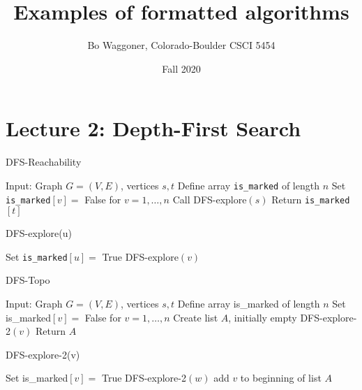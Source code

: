 \documentclass[10pt]{article}
\begin{document}
\title{Examples of formatted algorithms}
\author{Bo Waggoner, Colorado-Boulder CSCI 5454}
\date{Fall 2020}
\maketitle

\section{Lecture 2: Depth-First Search}

\begin{algorithm}
\caption{DFS-Reachability}
\begin{algorithmic}[1]
  \STATE Input: Graph $G = (V,E)$, vertices $s,t$
  \STATE Define array \texttt{is\_marked} of length $n$
  \STATE Set \texttt{is\_marked}$[v] = $ False for $v = 1,\dots,n$
  \STATE Call DFS-explore$(s)$
  \STATE Return \texttt{is\_marked}$[t]$
\end{algorithmic}
\end{algorithm}

\begin{algorithm}
\caption{DFS-explore(u)}
\begin{algorithmic}[1]
  \STATE Set \texttt{is\_marked}$[u] = $ True
      \STATE DFS-explore$(v)$
    \ENDIF
  \ENDFOR
\end{algorithmic}
\end{algorithm}


\begin{algorithm}
\caption{DFS-Topo}
\begin{algorithmic}[1]
  \STATE Input: Graph $G = (V,E)$, vertices $s,t$
  \STATE Define array is\_marked of length $n$
  \STATE Set is\_marked$[v] = $ False for $v = 1,\dots,n$
  \STATE Create list $A$, initially empty
      \STATE DFS-explore-2$(v)$
     \ENDIF
  \ENDFOR
  \STATE Return $A$
\end{algorithmic}
\end{algorithm}

\begin{algorithm}
\caption{DFS-explore-2(v)}
\begin{algorithmic}[1]
  \STATE Set is\_marked$[v] = $ True
      \STATE DFS-explore-2$(w)$
    \ENDIF
  \ENDFOR
  \STATE add $v$ to beginning of list $A$
\end{algorithmic}
\end{algorithm}
\end{document}

